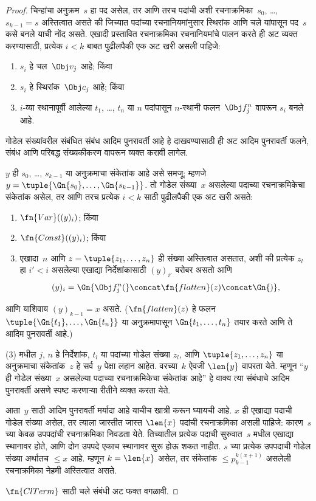 \begin{proof}
चिन्हांचा अनुक्रम~$s$ हा पद असेल, तर आणि तरच पदांची अशी
रचनाक्रमिका~$s_0$, \dots, $s_{k-1} = s$ अस्तित्वात असते की जिच्यात
पदांच्या रचनानियमांनुसार स्थिरांक आणि चले यांपासून
पद~$s$ कसे बनले याची नोंद असते. एखादी प्रस्तावित रचनाक्रमिका
रचनानियमांचे पालन करते ही अट व्यक्त करण्यासाठी, प्रत्येक $i < k$
बाबत पुढीलपैकी एक अट खरी असली पाहिजे:
\begin{enumerate}
\item $s_i$ हे चल~$\Obj v_j$ आहे; किंवा
\item $s_i$ हे स्थिरांक~$\Obj c_j$ आहे; किंवा
\item $i$-व्या स्थानापूर्वी आलेल्या $t_1$, \dots, $t_n$ या $n$
  पदांपासून $n$-स्थानी फलन~$\Obj f^n_j$ वापरून $s_i$ बनले आहे.
\end{enumerate}
गोडेल संख्यांवरील संबंधित संबंध आदिम पुनरावर्ती आहे हे दाखवण्यासाठी
ही अट आदिम पुनरावर्ती फलने, संबंध आणि परिबद्ध संख्यकीकरण वापरून
व्यक्त करावी लागेल.

$y$ ही $s_0$, \dots, $s_{k-1}$ या अनुक्रमाचा संकेतांक आहे असे समजू;
म्हणजे $y = \tuple{\Gn{s_0}, \dots, \Gn{s_{k-1}}}$. तो गोडेल
संख्या~$x$ असलेल्या पदाच्या रचनाक्रमिकेचा संकेतांक असेल, तर आणि तरच
प्रत्येक $i < k$ साठी पुढीलपैकी एक अट खरी असते:
\begin{enumerate}
\item $\fn{Var}((y)_i)$; किंवा
\item $\fn{Const}((y)_i)$; किंवा
\item एखादा~$n$ आणि $z = \tuple{z_1, \dots, z_n}$ ही संख्या
  अस्तित्वात असतात, अशी की प्रत्येक $z_l$ हा $i' < i$ असलेल्या
  एखाद्या निर्देशांकासाठी $(y)_{i'}$ बरोबर असतो आणि
\[(y)_i = \Gn{\Obj f^n_j(} \concat \fn{flatten}(z) \concat \Gn{)},
\]
\end{enumerate}
आणि याशिवाय $(y)_{k-1} = x$ असते. ($\fn{flatten}(z)$ हे फलन
$\tuple{\Gn{t_1}, \dots, \Gn{t_n}}$ या अनुक्रमापासून
$\Gn{t_1, \dots, t_n}$ तयार करते आणि ते आदिम पुनरावर्ती आहे.)

(3) मधील $j$, $n$ हे निर्देशांक, $t_l$ या पदांच्या गोडेल संख्या
$z_l$, आणि $\tuple{z_1, \dots, z_n}$ या अनुक्रमाचा संकेतांक~$z$
हे सर्व~$y$ पेक्षा लहान आहेत. वरच्या~$k$ ऐवजी $\len{y}$
वापरता येते. म्हणून ``$y$ ही गोडेल संख्या~$x$ असलेल्या पदाच्या
रचनाक्रमिकेचा संकेतांक आहे'' हे वाक्य त्या संबंधाचे आदिम पुनरावर्ती
असणे स्पष्ट करणाऱ्या रीतीने व्यक्त करता येते.

आता~$y$ साठी आदिम पुनरावर्ती मर्यादा आहे याचीच खात्री करून घ्यायची
आहे. $x$ ही एखाद्या पदाची गोडेल संख्या असेल, तर त्याला जास्तीत
जास्त $\len{x}$ पदांची रचनाक्रमिका असली पाहिजे: कारण~$s$ च्या
केवळ उपपदांची रचनाक्रमिका निवडता येते. तिच्यातील प्रत्येक पदाची
सुरुवात~$s$ मधील एखाद्या स्थानावर
होते, आणि दोन उपपदे एकाच स्थानावर सुरू होऊ शकत नाहीत. $s$ च्या
प्रत्येक उपपदाची गोडेल संख्या अर्थातच $\le x$ आहे. म्हणून
$k=\len{x}$ असेल, तर संकेतांक $\le p_{k-1}^{k(x+1)}$ असलेली
रचनाक्रमिका नेहमी अस्तित्वात असते.


$\fn{ClTerm}$ साठी चले संबंधी अट फक्त वगळावी.
\end{proof}

